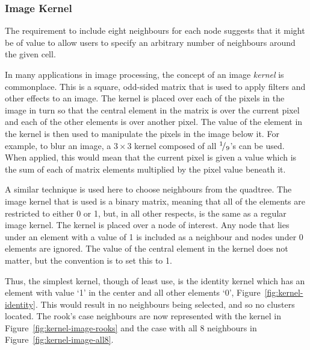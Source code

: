 \subsubsection*{Image Kernel}
\label{ssub:Image Kernel}

The requirement to include eight neighbours for each node suggests that it
might be of value to allow users to specify an arbitrary number of neighbours
around the given cell.

In many applications in image processing, the concept of an image \emph{kernel}
is commonplace. This is a square, odd-sided matrix that is used to apply
filters and other effects to an image. The kernel is placed over each of the
pixels in the image in turn so that the central element in the matrix is over
the current pixel and each of the other elements is over another pixel. The
value of the element in the kernel is then used to manipulate the pixels in the
image below it. For example, to blur an image, a $3\times 3$ kernel composed of
all ${}^{1}\!/_{9}$'s can be used. When applied, this would mean that the
current pixel is given a value which is the sum of each of matrix elements
multiplied by the pixel value beneath it.

A similar technique is used here to choose neighbours from the quadtree. The
image kernel that is used is a binary matrix, meaning that all of the elements
are restricted to either 0 or 1, but, in all other respects, is the same as a
regular image kernel. The kernel is placed over a node of interest. Any node
that lies under an element with a value of 1 is included as a neighbour and
nodes under 0 elements are ignored. The value of the central element in the
kernel does not matter, but the convention is to set this to 1.

Thus, the simplest kernel, though of least use, is the identity kernel which
has an element with value `1' in the center and all other elements `0',
Figure~\ref{fig:kernel-identity}. This would result in no neighbours being
selected, and so no clusters located. The rook's case neighbours are now
represented with the kernel in Figure~\ref{fig:kernel-image-rooks} and the case
with all 8 neighbours in Figure~\ref{fig:kernel-image-all8}.

